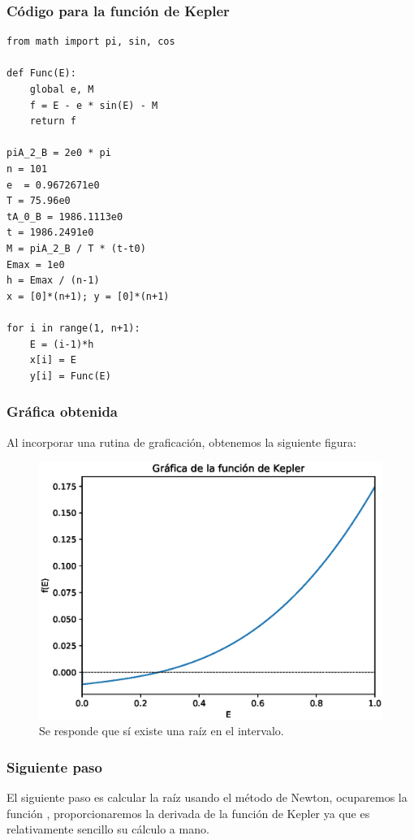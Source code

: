 \begin{frame}
\frametitle{Código para la función de Kepler}
\begin{lstlisting}[caption=Código para elaborar la gráfica de la función de Kepler, style=codigopython]
from math import pi, sin, cos

def Func(E):
    global e, M
    f = E - e * sin(E) - M
    return f

piA_2_B = 2e0 * pi
n = 101
e  = 0.9672671e0
T = 75.96e0
tA_0_B = 1986.1113e0
t = 1986.2491e0
M = piA_2_B / T * (t-t0)
Emax = 1e0
h = Emax / (n-1)
x = [0]*(n+1); y = [0]*(n+1)

for i in range(1, n+1):
    E = (i-1)*h
    x[i] = E
    y[i] = Func(E)
\end{lstlisting}
\end{frame}
\begin{frame}
\frametitle{Gráfica obtenida}
Al incorporar una rutina de graficación, obtenemos la siguiente figura:
\begin{figure}[h!]
    \centering
    \includegraphics[scale=0.4]{Imagenes/raices_scipy_aplicacion_01.eps}
    \caption{Se responde que sí existe una raíz en el intervalo.}
\end{figure}
\end{frame}
\begin{frame}
\frametitle{Siguiente paso}
El siguiente paso es calcular la raíz usando el método de Newton, ocuparemos la función , proporcionaremos la derivada de la función de Kepler ya que es relativamente sencillo su cálculo a mano.
\end{frame}
